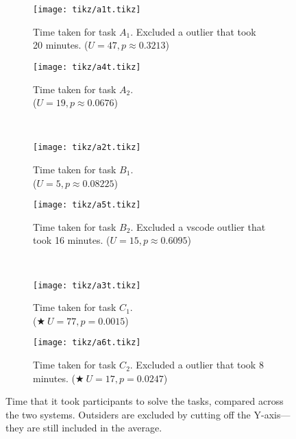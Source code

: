 \documentclass[../thesis]{subfiles}
\begin{document}
\begin{figure}
	\begin{subfigure}[T]{0.5\textwidth}
		\caption{Time taken for task $A_1$. Excluded a \SEE{} outlier that took 20 minutes.
			($U = 47, p \approx 0.3213$)
			\label{fig:a1t}}
		\texttt{[image: tikz/a1t.tikz]}
	\end{subfigure}\hfill
	\begin{subfigure}[T]{0.5\textwidth}
		\caption{Time taken for task $A_2$.\\
			($U = 19, p \approx 0.0676$)\label{fig:a2t}}
		\texttt{[image: tikz/a4t.tikz]}
	\end{subfigure}\\
	\begin{subfigure}[T]{0.5\textwidth}
		\caption{Time taken for task $B_1$.\\
			($U = 5, p \approx 0.08225$)\label{fig:b1t}}
		\texttt{[image: tikz/a2t.tikz]}
	\end{subfigure}\hfill
	\begin{subfigure}[T]{0.5\textwidth}
		\caption{Time taken for task $B_2$. Excluded a \gls{vscode} outlier that took 16 minutes.
			($U = 15, p \approx 0.6095$)\label{fig:b2t}}
		\texttt{[image: tikz/a5t.tikz]}
	\end{subfigure}\\
	\begin{subfigure}[T]{0.5\textwidth}
		\caption{Time taken for task $C_1$.\\
			($\bigstar\ U = 77, p = 0.0015$)\label{fig:c1t}}
		\texttt{[image: tikz/a3t.tikz]}
	\end{subfigure}\hfill
	\begin{subfigure}[T]{0.5\textwidth}
		\caption{Time taken for task $C_2$. Excluded a \SEE{} outlier that took 8 minutes.
			($\bigstar\ U = 17, p = 0.0247$)\label{fig:c2t}}
		\texttt{[image: tikz/a6t.tikz]}
	\end{subfigure}
	\caption{Time that it took participants to solve the tasks, compared across the two systems.
		Outsiders are excluded by cutting off the Y-axis---they are still included in the average.}\label{fig:time}
\end{figure}
\end{document}
